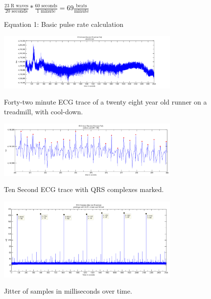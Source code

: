 \begin{figure}
	\begin{center}
		\label{fig:BasicPulse}
			$\frac{23 \text{ R waves}}{20 \text{ seconds}} * \frac{60 \text{ seconds}}{1 \text{ minute}} = 69 \frac{\text{beats}}{\text{minute}}$
		
		\caption{Equation 1: Basic pulse rate calculation}
	\end{center}
\end{figure}


\begin{figure}
	\begin{center}
		\label{fig:42minecg}
		\includegraphics[scale=1,width=0.8\textwidth]{Images/42MinECGTrace.png} 
		\caption{Forty-two minute ECG trace of a twenty eight year old runner on a treadmill, with cool-down.}
	\end{center}
\end{figure}


\begin{figure}
	\begin{center}
		\label{fig:10SecRunningQRS}
		\includegraphics[scale=1,width=0.8\textwidth]{Images/10SecRunning_withQRS.png}
		\caption{Ten Second ECG trace with QRS complexes marked.}
	\end{center}
\end{figure}


\begin{figure}
	\begin{center}
		\label{fig:ecgJitter}
		\includegraphics[scale=1,width=0.8\textwidth]{Images/ecgSampleJitter.png}
		\caption{Jitter of samples in milliseconds over time.}
	\end{center}
\end{figure}

